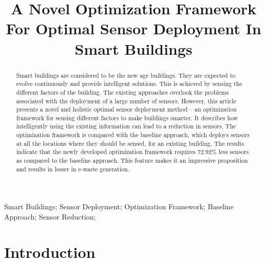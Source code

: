 \documentclass[]{interact}
\theoremstyle{plain}%
\theoremstyle{definition}
\theoremstyle{remark}
\begin{document}

\title{A Novel Optimization Framework For Optimal Sensor Deployment In Smart Buildings }

\author{
}

\maketitle

\begin{abstract}
  Smart buildings are considered to be the new age buildings.
  They are expected to evolve continuously and provide intelligent solutions.
  This is achieved by sensing the different factors of the building.
  The existing approaches overlook the problems associated with the deployment of a large number of sensors.
  However, this article presents a novel and holistic optimal sensor deployment method -- an optimization framework for sensing different factors to make buildings smarter.
  It describes how intelligently using the existing information can lead to a reduction in sensors.
  The optimization framework is compared with the baseline approach, which deploys sensors at all the locations where they should be sensed, for an existing building.
  The results indicate that the newly developed optimization framework requires 72.92\% less sensors as compared to the baseline approach.
  This feature makes it an impressive proposition and results in lesser in e-waste generation. 
\end{abstract}

\begin{keywords}
Smart Buildings; Sensor Deployment; Optimization Framework; Baseline Approach; Sensor Reduction;
\end{keywords}

\section{Introduction}
\end{document}

